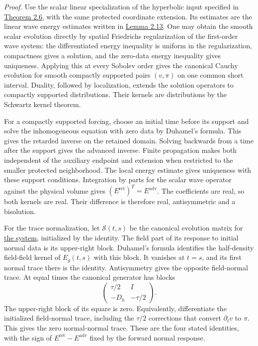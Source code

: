 \documentclass[
  english,
  11pt,
  reqno]{amsart}
\begin{document}
\emph{Proof.} Use the scalar linear specialization of the hyperbolic
input specified in
\hyperref[thm:online-smooth-local-cauchy-input]{Theorem 2.6}, with the
same protected coordinate extension. Its estimates are the linear wave
energy estimates written in
\hyperref[lem:online-reduced-cauchy-finite-family-estimates]{Lemma
2.13}. One may obtain the smooth scalar evolution directly by spatial
Friedrichs regularization of the first-order wave system: the
differentiated energy inequality is uniform in the regularization,
compactness gives a solution, and the zero-data energy inequality gives
uniqueness. Applying this at every Sobolev order gives the canonical
Cauchy evolution for smooth compactly supported pairs \((v,\pi)\) on one
common short interval. Duality, followed by localization, extends the
solution operators to compactly supported distributions. Their kernels
are distributions by the Schwartz kernel theorem.

For a compactly supported forcing, choose an initial time before its
support and solve the inhomogeneous equation with zero data by Duhamel's
formula. This gives the retarded inverse on the retained domain. Solving
backwards from a time after the support gives the advanced inverse.
Finite propagation makes both independent of the auxiliary endpoint and
extension when restricted to the smaller protected neighborhood. The
local energy estimate gives uniqueness with these support conditions.
Integration by parts for the scalar wave operator against the physical
volume gives \((E^{\mathrm{ret}})^T=E^{\mathrm{adv}}\). The coefficients
are real, so both kernels are real. Their difference is therefore real,
antisymmetric and a bisolution.

For the trace normalization, let \(\mathcal S(t,s)\) be the canonical
evolution matrix for
\hyperref[eq:online-wave-canonical-cauchy-system]{the system},
initialized by the identity. The field part of its response to initial
normal data is its upper-right block. Duhamel's formula identifies the
half-density field-field kernel of \(E_g(t,s)\) with this block. It
vanishes at \(t=s\), and its first normal trace there is the identity.
Antisymmetry gives the opposite field-normal trace. At equal times the
canonical generator has blocks \[
\begin{pmatrix}\tau/2&I\\-D_h&-\tau/2\end{pmatrix}.
\] The upper-right block of its square is zero. Equivalently,
differentiate the initialized field-normal trace, including the
\(\tau/2\) corrections that convert \(\partial_t v\) to \(\pi\). This
gives the zero normal-normal trace. These are the four stated
identities, with the sign of \(E^{\mathrm{ret}}-E^{\mathrm{adv}}\) fixed
by the forward normal response.
\end{document}

